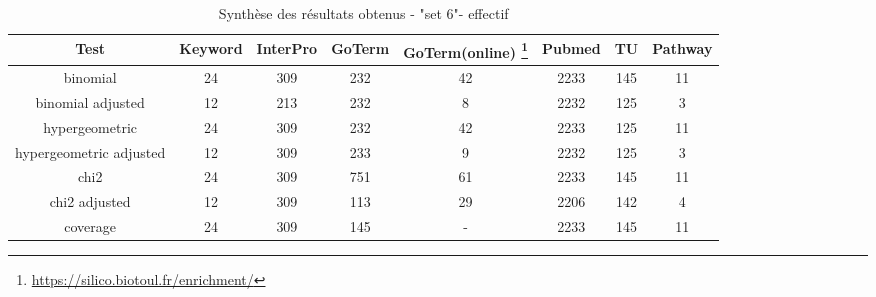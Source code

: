 \documentclass[a4paper,11pt,openright]{report}
\begin{document}
\begin{table}
\centering
\label{tab:res-app}

\begin{tabular}{|c||c|c|c|c|c|c|c|}
\hline 
\textbf{Test} & \textbf{Keyword}  & \textbf{InterPro}  & \textbf{GoTerm} & \textbf{GoTerm}(online)
\footnote{\url{https://silico.biotoul.fr/enrichment/}} & \textbf{Pubmed} & \textbf{TU} & \textbf{Pathway} \\ 
\hline 
\hline 
binomial & 24 & 309 & 232 & 42 & 2233 & 145 & 11 \\ 
\hline 
binomial adjusted  & 12 & 213 & 232 & 8 & 2232 & 125  & 3 \\ 
\hline 
hypergeometric  & 24 & 309 & 232 & 42 & 2233 & 125 & 11 \\ 
\hline 
hypergeometric adjusted & 12 & 309 & 233 & 9 & 2232 & 125 & 3\\ 
\hline 
chi2 & 24 & 309 & 751 & 61 & 2233 & 145 & 11 \\ 
\hline 
chi2 adjusted & 12 & 309 & 113 & 29 & 2206 & 142 & 4  \\ 
\hline 
coverage & 24 & 309 & 145 & - & 2233 & 145 & 11 \\ 
\hline 
\end{tabular} 

\caption{Synthèse des résultats obtenus - "set 6"- effectif }
\end{table}
\end{document}
